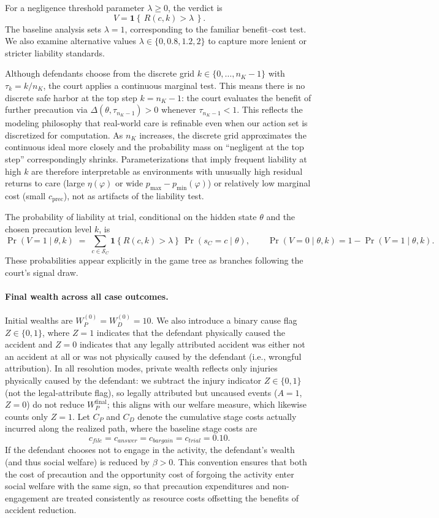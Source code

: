 \documentclass{article}
\begin{document}
For a negligence threshold parameter $\lambda \ge 0$, the verdict is
\[
V=\mathbf{1}\!\left\{\,R(c,k)>\lambda\,\right\}.
\]
The baseline analysis sets $\lambda=1$, corresponding to the familiar benefit–cost test. We also examine alternative values $\lambda\in\{0,0.8,1.2,2\}$ to capture more lenient or stricter liability standards. 

Although defendants choose from the discrete grid $k\in\{0,\dots,n_K-1\}$ with $\tau_k=k/n_K$, the court applies a continuous marginal test. This means there is no discrete safe harbor at the top step $k=n_K-1$: the court evaluates the benefit of further precaution via $\Delta(\theta,\tau_{n_K-1})>0$ whenever $\tau_{n_K-1}<1$. This reflects the modeling philosophy that real-world care is refinable even when our action set is discretized for computation. As $n_K$ increases, the discrete grid approximates the continuous ideal more closely and the probability mass on “negligent at the top step” correspondingly shrinks. Parameterizations that imply frequent liability at high $k$ are therefore interpretable as environments with unusually high residual returns to care (large $\eta(\varphi)$ or wide $p_{\max}-p_{\min}(\varphi)$) or relatively low marginal cost (small $c_{\mathrm{prec}}$), not as artifacts of the liability test.


The probability of liability at trial, conditional on the hidden state $\theta$ and the chosen precaution level $k$, is
\[
\Pr(V=1\mid \theta,k)\;=\;\sum_{c\in\mathcal{S}_C}\mathbf{1}\!\left\{R(c,k)>\lambda\right\}\,\Pr(s_C=c\mid \theta),
\qquad
\Pr(V=0\mid \theta,k)=1-\Pr(V=1\mid \theta,k).
\]
These probabilities appear explicitly in the game tree as branches following the court’s signal draw.

\paragraph{Final wealth across all case outcomes.}
Initial wealths are $W_P^{(0)}=W_D^{(0)}=10$. We also introduce a binary cause flag $Z\in\{0,1\}$, where $Z=1$ indicates that the defendant physically caused the accident and $Z=0$ indicates that any legally attributed accident was either not an accident at all or was not physically caused by the defendant (i.e., wrongful attribution). In all resolution modes, private wealth reflects only injuries physically caused by the defendant: we subtract the injury indicator $Z\in\{0,1\}$ (not the legal-attribute flag), so legally attributed but uncaused events ($A=1$, $Z=0$) do not reduce $W_P^{\mathrm{final}}$; this aligns with our welfare measure, which likewise counts only $Z=1$.
Let $C_P$ and $C_D$ denote the cumulative stage costs actually incurred along the realized path, where the baseline stage costs are
\[
c_{file}=c_{answer}=c_{bargain}=c_{trial}=0.10.
\]
If the defendant chooses not to engage in the activity, the defendant's wealth (and thus social welfare) is reduced by $\beta > 0$. This convention ensures that both the cost of precaution and the opportunity cost of forgoing the activity enter social welfare with the same sign, so that precaution expenditures and non-engagement are treated consistently as resource costs offsetting the benefits of accident reduction.
\end{document}
